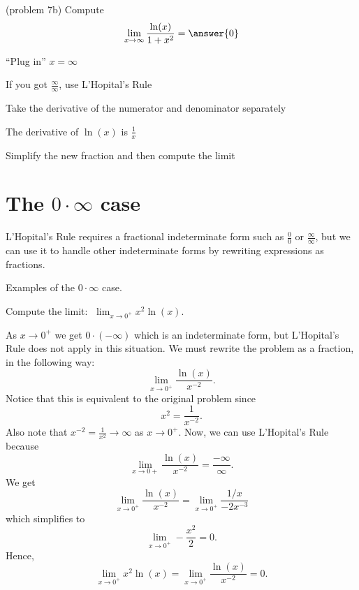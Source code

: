 \documentclass[handout]{ximera}
\begin{document}
\begin{problem}(problem 7b)
  Compute
  \[
  \lim_{x \to \infty} \frac{\ln(x)}{1 + x^2} = \answer{0}
  \]
  
    \begin{hint}
      ``Plug in'' $x=\infty$
    \end{hint}
    \begin{hint}
      If you got $\frac{\infty}{\infty}$, use L'Hopital's Rule
    \end{hint}
    \begin{hint}
      Take the derivative of the numerator and denominator separately
    \end{hint}
		\begin{hint}
		  The derivative of $\ln(x)$ is $\frac{1}{x}$
	  \end{hint}
		\begin{hint}
      Simplify the new fraction and then compute the limit
    \end{hint}
	
\end{problem}


\section{The $0 \cdot \infty$ case}

L'Hopital's Rule requires a fractional indeterminate form such as $\frac00$ or $\frac{\infty}{\infty}$, 
but we can use it to handle other indeterminate forms by rewriting expressions as fractions.

Examples of the $0\cdot\infty$ case.

\begin{example}[example 8]
Compute the limit:  $\displaystyle{\;\lim_{x \to 0^+}x^2 \ln(x)}$.

As $x\to 0^+$ we get $0 \cdot (-\infty)$ which is an indeterminate form, but L'Hopital's Rule does not apply in this situation.
We must rewrite the problem as a fraction, in the following way:
\[\lim_{x \to 0^+}\frac{\ln(x)}{x^{-2}}.\]
Notice that this is equivalent to the original problem since 
\[x^2 = \frac{1}{x^{-2}}.\]
Also note that $x^{-2} =\frac{1}{x^2} \to \infty$ as $x\to 0^+$.
Now, we can use L'Hopital's Rule because 
\[\lim_{x \to 0+}\frac{\ln(x)}{x^{-2}}= \frac{-\infty}{\infty}.\]
We get
\[\lim_{x \to 0^+}\frac{\ln(x)}{x^{-2}}= \lim_{x\to 0^+} \frac{1/x}{-2x^{-3}}\]
which simplifies to
\[\lim_{x \to 0^+}-\frac{x^2}{2}= 0.\]
Hence, 
\[\lim_{x \to 0^+} x^2 \ln(x)=\lim_{x \to 0^+}\frac{\ln(x)}{x^{-2}}= 0.\]
\end{example}
\end{document}
